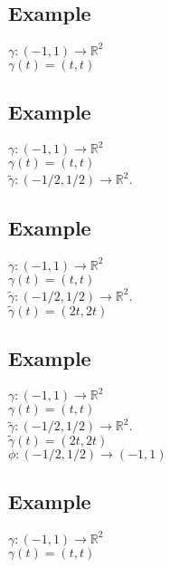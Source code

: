 \documentclass[twocolumn,20pt,fleqn]{extarticle}
\theoremstyle{plain}
\theoremstyle{definition}
\theoremstyle{remark}
\begin{document}
\clearpage



\subsection{Example}
  $\gamma : (-1, 1) \to \mathbb{R}^2$\\
  $\gamma(t) = (t,t)$


\clearpage



\subsection{Example}
  $\gamma : (-1, 1) \to \mathbb{R}^2$\\
  $\gamma(t) = (t,t)$\\

  $\tilde{\gamma} : (-1/2, 1/2) \to \mathbb{R}^2$.


\clearpage



\subsection{Example}
  $\gamma : (-1, 1) \to \mathbb{R}^2$\\
  $\gamma(t) = (t,t)$\\

  $\tilde{\gamma} : (-1/2, 1/2) \to \mathbb{R}^2$.\\
  $\tilde{\gamma}(t) = (2t,2t)$


\clearpage



\subsection{Example}
  $\gamma : (-1, 1) \to \mathbb{R}^2$\\
  $\gamma(t) = (t,t)$\\

  $\tilde{\gamma} : (-1/2, 1/2) \to \mathbb{R}^2$.\\
  $\tilde{\gamma}(t) = (2t,2t)$\\

  $\phi: (-1/2,1/2) \to (-1,1)$


\clearpage



\subsection{Example}
  $\gamma : (-1, 1) \to \mathbb{R}^2$\\
  $\gamma(t) = (t,t)$\\
\end{document}
